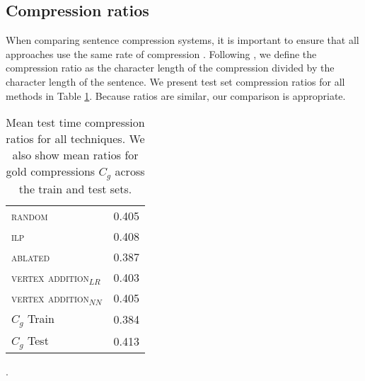 \subsection{Compression ratios}

When comparing sentence compression systems, it is important to ensure that all approaches use the same rate of compression \cite{napoles2011evaluating}. Following \citet{filippova2015sentence}, we define the compression ratio as the character length of the compression divided by the character length of the sentence. We present test set compression ratios for all methods in Table \ref{t:cr}. Because ratios are similar, our comparison is appropriate.

\begin{table}[htb!]
\centering
\begin{tabular}{@{}l | l@{}}
\textsc{random} & 0.405\\ 
\textsc{ilp} &  0.408 \\
\textsc{ablated} & 0.387 \\
\textsc{vertex addition}$_{LR}$ &  0.403  \\
\textsc{vertex addition}$_{NN}$ &  0.405  \\ \midrule
$C_g$ Train  & 0.384 \\
$C_g$ Test   & 0.413 \\
\end{tabular}
\caption{Mean test time compression ratios for all techniques. We also show mean ratios for gold compressions $C_g$ across the train and test sets.}\label{t:cr}.
\end{table}

